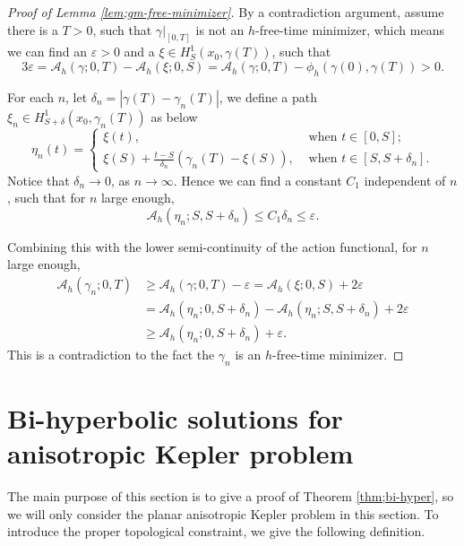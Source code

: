 \documentclass[11pt]{amsart}
\newcommand{\A}{\mathcal A}
\newcommand{\gm}{\gamma}
\newcommand{\ep}{\varepsilon}
\newcommand{\dl}{\delta}
\theoremstyle{plain}
\theoremstyle{definition}
\theoremstyle{remark}
\begin{document}
\begin{proof}[Proof of Lemma \ref{lem;gm-free-minimizer}]
By a contradiction argument, assume there is a $T>0$, such that $\gm|_{[0, T]}$ is not an $h$-free-time minimizer, which means we can find an $\ep >0$ and a $\xi \in H^1_S(x_0, \gm(T))$, such that 
\begin{equation*}
\label{eq;3ep} 3\ep = \A_h(\gm; 0, T) -\A_h(\xi; 0, S) = \A_h(\gm; 0, T) - \phi_h(\gm(0), \gm(T)) >0. 
\end{equation*}

For each $n$, let $\dl_n = |\gm(T)- \gm_n(T)|$, we define a path $\xi_n \in H^1_{S +\dl}(x_0, \gm_n(T))$ as below
\begin{equation*}
\label{eq;eta-n} \eta_n(t) = \begin{cases}
\xi(t), & \text{ when } t \in [0, S]; \\
\xi(S) + \frac{t -S}{\dl_n}(\gm_n(T) -\xi(S)), & \text{ when } t \in [S, S+\dl_n]. 
\end{cases}
\end{equation*}
Notice that $\dl_n \to 0$, as $n \to \infty$. Hence we can find a constant $C_1$ independent of $n$, such that for $n$ large enough, 
\begin{equation*}
\label{eq;ep-1} \A_h(\eta_n; S, S+\dl_n)  \le C_1 \dl_n \le \ep. 
\end{equation*}

Combining this with the lower semi-continuity of the action functional, for $n$ large enough,  
$$ \begin{aligned}
\A_h(\gm_n; 0, T) & \ge \A_h(\gm; 0, T) -\ep = \A_h(\xi; 0, S) +2\ep \\
			& = \A_h(\eta_n; 0, S+\dl_n) - \A_h(\eta_n; S, S+\dl_n) +2\ep \\
			& \ge \A_h(\eta_n; 0, S+\dl_n) +\ep. 
\end{aligned}
$$
This is a contradiction to the fact the $\gm_n$ is an $h$-free-time minimizer. 
\end{proof}






\section{Bi-hyperbolic solutions for anisotropic Kepler problem}

The main purpose of this section is to give a proof of Theorem \ref{thm;bi-hyper}, so we will only consider the planar anisotropic Kepler problem in this section. To introduce the proper topological constraint, we give the following definition. 
\end{document}
